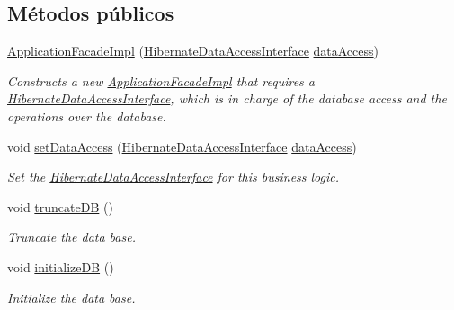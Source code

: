 \subsection*{Métodos públicos}
\begin{DoxyCompactItemize}
\item 
\mbox{\hyperlink{classcom_1_1ruralhousejsf_1_1business_logic_1_1_application_facade_impl_ad6ed360c754c5ba82a2b88bb4cf036f7}{Application\+Facade\+Impl}} (\mbox{\hyperlink{interfacecom_1_1ruralhousejsf_1_1data_access_1_1_hibernate_data_access_interface}{Hibernate\+Data\+Access\+Interface}} \mbox{\hyperlink{classcom_1_1ruralhousejsf_1_1business_logic_1_1_application_facade_impl_a96ac80fe606a4649e5fbbbd24935690a}{data\+Access}})
\begin{DoxyCompactList}\small\item\em Constructs a new \mbox{\hyperlink{classcom_1_1ruralhousejsf_1_1business_logic_1_1_application_facade_impl}{Application\+Facade\+Impl}} that requires a \mbox{\hyperlink{}{Hibernate\+Data\+Access\+Interface}}, which is in charge of the database access and the operations over the database. \end{DoxyCompactList}\item 
void \mbox{\hyperlink{classcom_1_1ruralhousejsf_1_1business_logic_1_1_application_facade_impl_a78fc6968b9fec7aa475b322463b6bd92}{set\+Data\+Access}} (\mbox{\hyperlink{interfacecom_1_1ruralhousejsf_1_1data_access_1_1_hibernate_data_access_interface}{Hibernate\+Data\+Access\+Interface}} \mbox{\hyperlink{classcom_1_1ruralhousejsf_1_1business_logic_1_1_application_facade_impl_a96ac80fe606a4649e5fbbbd24935690a}{data\+Access}})
\begin{DoxyCompactList}\small\item\em Set the \mbox{\hyperlink{}{Hibernate\+Data\+Access\+Interface}} for this business logic. \end{DoxyCompactList}\item 
void \mbox{\hyperlink{classcom_1_1ruralhousejsf_1_1business_logic_1_1_application_facade_impl_a5fe9f44c95b3459fb8999c26e5b934cb}{truncate\+DB}} ()
\begin{DoxyCompactList}\small\item\em Truncate the data base. \end{DoxyCompactList}\item 
void \mbox{\hyperlink{classcom_1_1ruralhousejsf_1_1business_logic_1_1_application_facade_impl_a1e6cbb70c9568899c86135b3264b431d}{initialize\+DB}} ()
\begin{DoxyCompactList}\small\item\em Initialize the data base. \end{DoxyCompactList}\item 

\end{DoxyCompactItemize}
